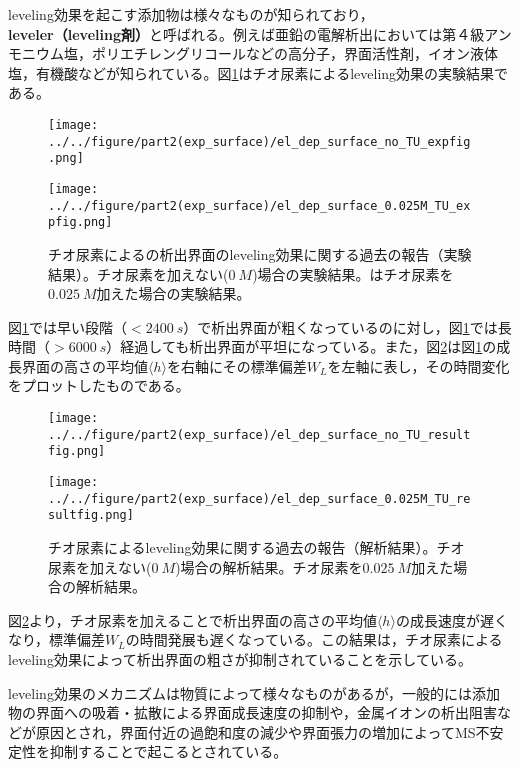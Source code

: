 \documentclass[autodetect-engine,dvi=dvipdfmx,a4paper,ja=standard,oneside,openany,11pt]{bxjsbook}
\begin{document}
leveling効果を起こす添加物は様々なものが知られており，\textbf{leveler（leveling剤）}と呼ばれる。例えば亜鉛の電解析出においては第４級アンモニウム塩，ポリエチレングリコールなどの高分子，界面活性剤，イオン液体塩，有機酸\cite{sorour2017review}などが知られている。図\ref{fig:leveling}はチオ尿素によるleveling効果の実験結果である\cite{schilardi1998evolution}。
\begin{figure}[htbp]
  \begin{minipage}
    {0.5\textwidth}
    \subcaption{}
    \centering
    \texttt{[image: ../../figure/part2(exp\_surface)/el\_dep\_surface\_no\_TU\_expfig.png]}
    \label{fig:no_leveling_effect}
  \end{minipage}
  \begin{minipage}
    {0.5\textwidth}
    \subcaption{}
    \centering
    \texttt{[image: ../../figure/part2(exp\_surface)/el\_dep\_surface\_0.025M\_TU\_expfig.png]}
    \label{fig:leveling_effect}
  \end{minipage}
  \caption{チオ尿素によるの析出界面のleveling効果に関する過去の報告（実験結果）\cite{schilardi1998evolution}。チオ尿素を加えない($\SI{0}{M}$)場合の実験結果。はチオ尿素を$\SI{0.025}{M}$加えた場合の実験結果。}
  \label{fig:leveling}
\end{figure}
図\ref{fig:leveling}では早い段階（$<\SI{2400}{s}$）で析出界面が粗くなっているのに対し，図\ref{fig:leveling}では長時間（$>\SI{6000}{s}$）経過しても析出界面が平坦になっている。また，図\ref{fig:leveling_result}は図\ref{fig:leveling}の成長界面の高さの平均値$\langle h\rangle$を右軸にその標準偏差$W_L$を左軸に表し，その時間変化をプロットしたものである。
\begin{figure}[htbp]
  \begin{minipage}
    {0.5\textwidth}
    \subcaption{}
    \centering
    \texttt{[image: ../../figure/part2(exp\_surface)/el\_dep\_surface\_no\_TU\_resultfig.png]}
    \label{fig:no_leveling_effect_result}
  \end{minipage}
  \begin{minipage}
    {0.5\textwidth}
    \subcaption{}
    \centering
    \texttt{[image: ../../figure/part2(exp\_surface)/el\_dep\_surface\_0.025M\_TU\_resultfig.png]}
    \label{fig:leveling_effect_result}
  \end{minipage}
  \caption{チオ尿素によるleveling効果に関する過去の報告（解析結果）\cite{schilardi1998evolution}。チオ尿素を加えない($\SI{0}{M}$)場合の解析結果。チオ尿素を$\SI{0.025}{M}$加えた場合の解析結果。}
  \label{fig:leveling_result}
\end{figure}
図\ref{fig:leveling_result}より，チオ尿素を加えることで析出界面の高さの平均値$\langle h\rangle$の成長速度が遅くなり，標準偏差$W_L$の時間発展も遅くなっている。この結果は，チオ尿素によるleveling効果によって析出界面の粗さが抑制されていることを示している。

leveling効果のメカニズムは物質によって様々なものがある\cite{めっき添加剤の作用機構と表面形状制御}が，一般的には添加物の界面への吸着・拡散による界面成長速度の抑制や，金属イオンの析出阻害などが原因とされ\cite{oniciu1991some}，界面付近の過飽和度の減少や界面張力の増加によってMS不安定性を抑制することで起こるとされている。

\ifdraft{
  
  
}{}
\end{document}
